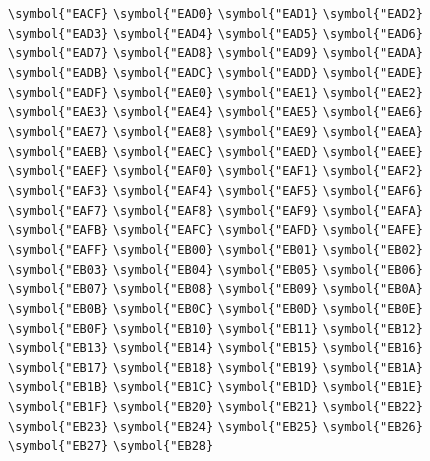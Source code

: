 \documentclass{ctexbook}
\begin{document}
 \verb|\symbol{"EACF}|  \verb|\symbol{"EAD0}|  \verb|\symbol{"EAD1}|  \verb|\symbol{"EAD2}|  \verb|\symbol{"EAD3}|  \verb|\symbol{"EAD4}|  \verb|\symbol{"EAD5}|  \verb|\symbol{"EAD6}|  \verb|\symbol{"EAD7}|  \verb|\symbol{"EAD8}|  \verb|\symbol{"EAD9}|  \verb|\symbol{"EADA}|  \verb|\symbol{"EADB}|  \verb|\symbol{"EADC}|  \verb|\symbol{"EADD}|  \verb|\symbol{"EADE}|  \verb|\symbol{"EADF}|  \verb|\symbol{"EAE0}|  \verb|\symbol{"EAE1}|  \verb|\symbol{"EAE2}|  \verb|\symbol{"EAE3}|  \verb|\symbol{"EAE4}|  \verb|\symbol{"EAE5}|  \verb|\symbol{"EAE6}|  \verb|\symbol{"EAE7}|  \verb|\symbol{"EAE8}|  \verb|\symbol{"EAE9}|  \verb|\symbol{"EAEA}|  \verb|\symbol{"EAEB}|  \verb|\symbol{"EAEC}|  \verb|\symbol{"EAED}|  \verb|\symbol{"EAEE}|  \verb|\symbol{"EAEF}|  \verb|\symbol{"EAF0}|  \verb|\symbol{"EAF1}|  \verb|\symbol{"EAF2}|  \verb|\symbol{"EAF3}|  \verb|\symbol{"EAF4}|  \verb|\symbol{"EAF5}|  \verb|\symbol{"EAF6}|  \verb|\symbol{"EAF7}|  \verb|\symbol{"EAF8}|  \verb|\symbol{"EAF9}|  \verb|\symbol{"EAFA}|  \verb|\symbol{"EAFB}|  \verb|\symbol{"EAFC}|  \verb|\symbol{"EAFD}|  \verb|\symbol{"EAFE}|  \verb|\symbol{"EAFF}|  \verb|\symbol{"EB00}|  \verb|\symbol{"EB01}|  \verb|\symbol{"EB02}|  \verb|\symbol{"EB03}|  \verb|\symbol{"EB04}|  \verb|\symbol{"EB05}|  \verb|\symbol{"EB06}|  \verb|\symbol{"EB07}|  \verb|\symbol{"EB08}|  \verb|\symbol{"EB09}|  \verb|\symbol{"EB0A}|  \verb|\symbol{"EB0B}|  \verb|\symbol{"EB0C}|  \verb|\symbol{"EB0D}|  \verb|\symbol{"EB0E}|  \verb|\symbol{"EB0F}|  \verb|\symbol{"EB10}|  \verb|\symbol{"EB11}|  \verb|\symbol{"EB12}|  \verb|\symbol{"EB13}|  \verb|\symbol{"EB14}|  \verb|\symbol{"EB15}|  \verb|\symbol{"EB16}|  \verb|\symbol{"EB17}|  \verb|\symbol{"EB18}|  \verb|\symbol{"EB19}|  \verb|\symbol{"EB1A}|  \verb|\symbol{"EB1B}|  \verb|\symbol{"EB1C}|  \verb|\symbol{"EB1D}|  \verb|\symbol{"EB1E}|  \verb|\symbol{"EB1F}|  \verb|\symbol{"EB20}|  \verb|\symbol{"EB21}|  \verb|\symbol{"EB22}|  \verb|\symbol{"EB23}|  \verb|\symbol{"EB24}|  \verb|\symbol{"EB25}|  \verb|\symbol{"EB26}|  \verb|\symbol{"EB27}|  \verb|\symbol{"EB28}| 
\end{document}
